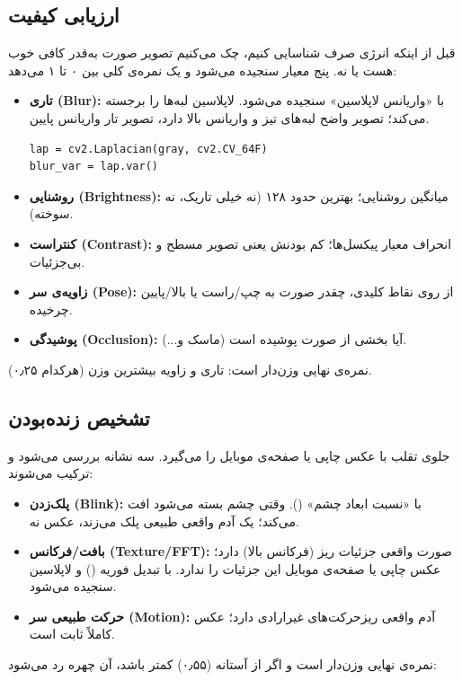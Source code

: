\documentclass[12pt,a4paper]{article}
\begin{document}
\subsection{ارزیابی کیفیت}
قبل از اینکه انرژی صرف شناسایی کنیم، چک می‌کنیم تصویر صورت به‌قدر کافی خوب هست یا نه. پنج معیار سنجیده می‌شود و یک نمره‌ی کلی بین ۰ تا ۱ می‌دهد:
\begin{itemize}[rightmargin=0pt]
  \item \textbf{تاری (Blur):} با «واریانس لاپلاسین» سنجیده می‌شود. لاپلاسین لبه‌ها را برجسته می‌کند؛ تصویر واضح لبه‌های تیز و واریانس بالا دارد، تصویر تار واریانس پایین.
\begin{latin}
\begin{lstlisting}
lap = cv2.Laplacian(gray, cv2.CV_64F)
blur_var = lap.var()
\end{lstlisting}
\end{latin}
  \item \textbf{روشنایی (Brightness):} میانگین روشنایی؛ بهترین حدود ۱۲۸ (نه خیلی تاریک، نه سوخته).
  \item \textbf{کنتراست (Contrast):} انحراف معیار پیکسل‌ها؛ کم بودنش یعنی تصویر مسطح و بی‌جزئیات.
  \item \textbf{زاویه‌ی سر (Pose):} از روی نقاط کلیدی، چقدر صورت به چپ/راست یا بالا/پایین چرخیده.
  \item \textbf{پوشیدگی (Occlusion):} آیا بخشی از صورت پوشیده است (ماسک و...).
\end{itemize}
نمره‌ی نهایی وزن‌دار است: تاری و زاویه بیشترین وزن (هرکدام ۰٫۲۵).

\subsection{تشخیص زنده‌بودن}
جلوی تقلب با عکس چاپی یا صفحه‌ی موبایل را می‌گیرد. سه نشانه بررسی می‌شود و ترکیب می‌شوند:
\begin{itemize}[rightmargin=0pt]
  \item \textbf{پلک‌زدن (Blink):} با «نسبت ابعاد چشم» (). وقتی چشم بسته می‌شود  افت می‌کند؛ یک آدم واقعی طبیعی پلک می‌زند، عکس نه.
  \item \textbf{بافت/فرکانس (Texture/FFT):} صورت واقعی جزئیات ریز (فرکانس بالا) دارد؛ عکس چاپی یا صفحه‌ی موبایل این جزئیات را ندارد. با تبدیل فوریه () و لاپلاسین سنجیده می‌شود.
  \item \textbf{حرکت طبیعی سر (Motion):} آدم واقعی ریز‌حرکت‌های غیرارادی دارد؛ عکس کاملاً ثابت است.
\end{itemize}
نمره‌ی نهایی وزن‌دار است و اگر از آستانه (۰٫۵۵) کمتر باشد، آن چهره رد می‌شود:
\end{document}
